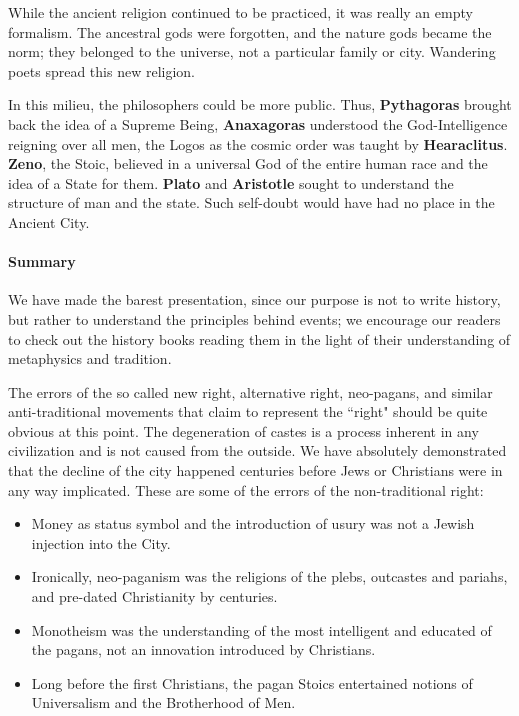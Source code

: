 While the ancient religion continued to be practiced, it was really an empty formalism. The ancestral gods were forgotten, and the nature gods became the norm; they belonged to the universe, not a particular family or city. Wandering poets spread this new religion.

In this milieu, the philosophers could be more public. Thus, \textbf{Pythagoras} brought back the idea of a Supreme Being, \textbf{Anaxagoras} understood the God-Intelligence reigning over all men, the Logos as the cosmic order was taught by \textbf{Hearaclitus}. \textbf{Zeno}, the Stoic, believed in a universal God of the entire human race and the idea of a State for them. \textbf{Plato} and \textbf{Aristotle} sought to understand the structure of man and the state. Such self-doubt would have had no place in the Ancient City.

\paragraph{Summary}
We have made the barest presentation, since our purpose is not to write history, but rather to understand the principles behind events; we encourage our readers to check out the history books reading them in the light of their understanding of metaphysics and tradition.

The errors of the so called new right, alternative right, neo-pagans, and similar anti-traditional movements that claim to represent the ``right" should be quite obvious at this point. The degeneration of castes is a process inherent in any civilization and is not caused from the outside. We have absolutely demonstrated that the decline of the city happened centuries before Jews or Christians were in any way implicated. These are some of the errors of the non-traditional right:

\begin{itemize}
\item Money as status symbol and the introduction of usury was not a Jewish injection into the City. 
\item Ironically, neo-paganism was the religions of the plebs, outcastes and pariahs, and pre-dated Christianity by centuries. 
\item Monotheism was the understanding of the most intelligent and educated of the pagans, not an innovation introduced by Christians. 
\item Long before the first Christians, the pagan Stoics entertained notions of Universalism and the Brotherhood of Men. 


\end{itemize}

